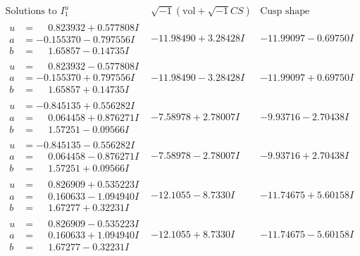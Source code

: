 \documentclass[1p]{elsarticle_modified}
\theoremstyle{definition}
\newcommand{\I}{\sqrt{-1}}
\begin{document}
$$\begin{array}{c|c|c}  
\text{Solutions to }I^u_{1}& \I (\text{vol} + \sqrt{-1}CS) & \text{Cusp shape}\\
 \hline 
\begin{aligned}
u &= \phantom{-}0.823932 + 0.577808 I \\
a &= -0.155370 - 0.797556 I \\
b &= \phantom{-}1.65857 - 0.14735 I\end{aligned}
 & -11.98490 + 3.28428 I & -11.99097 - 0.69750 I \\ \hline\begin{aligned}
u &= \phantom{-}0.823932 - 0.577808 I \\
a &= -0.155370 + 0.797556 I \\
b &= \phantom{-}1.65857 + 0.14735 I\end{aligned}
 & -11.98490 - 3.28428 I & -11.99097 + 0.69750 I \\ \hline\begin{aligned}
u &= -0.845135 + 0.556282 I \\
a &= \phantom{-}0.064458 + 0.876271 I \\
b &= \phantom{-}1.57251 - 0.09566 I\end{aligned}
 & -7.58978 + 2.78007 I & -9.93716 - 2.70438 I \\ \hline\begin{aligned}
u &= -0.845135 - 0.556282 I \\
a &= \phantom{-}0.064458 - 0.876271 I \\
b &= \phantom{-}1.57251 + 0.09566 I\end{aligned}
 & -7.58978 - 2.78007 I & -9.93716 + 2.70438 I \\ \hline\begin{aligned}
u &= \phantom{-}0.826909 + 0.535223 I \\
a &= \phantom{-}0.160633 - 1.094940 I \\
b &= \phantom{-}1.67277 + 0.32231 I\end{aligned}
 & -12.1055 - 8.7330 I & -11.74675 + 5.60158 I \\ \hline\begin{aligned}
u &= \phantom{-}0.826909 - 0.535223 I \\
a &= \phantom{-}0.160633 + 1.094940 I \\
b &= \phantom{-}1.67277 - 0.32231 I\end{aligned}
 & -12.1055 + 8.7330 I & -11.74675 - 5.60158 I \\ \hline\begin{aligned}

\end{aligned}
\end{array}$$
\end{document}
